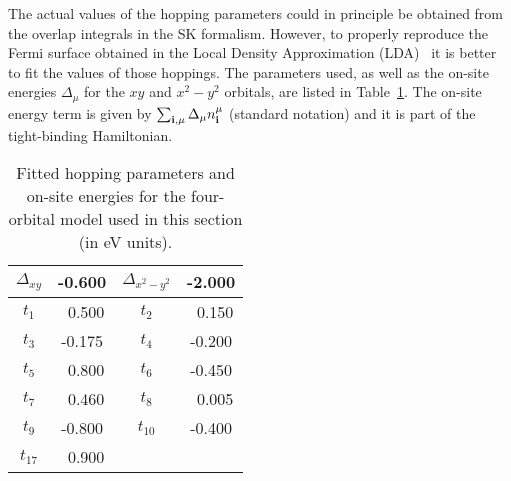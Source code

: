 \documentclass[aps,prb,superscriptaddress,preprintnumbers,
showpacs,legalpaper,twoside,twocolumn,amsmath,amssymb]{revtex4}
\begin{document}
The actual values of the hopping parameters could in principle be
obtained from the overlap integrals in the SK
formalism.\cite{slater,Moreoetal08}
However, to properly reproduce the Fermi surface obtained in the
Local Density Approximation (LDA)~\cite{singh,first, xu, cao, fang2} it is better to fit
the values of those hoppings. The
parameters used, as well as the on-site energies $\Delta_\mu$ for the
$xy$ and $x^2-y^2$ orbitals, are
listed in Table~\ref{T.hoppara}. The on-site energy term is
given by $\sum_{{\bf i},\mu} \Delta_{\mu} n^{\mu}_{\bf i}$ (standard notation)
and it is part of the tight-binding Hamiltonian.



\begin{table}[h]
\caption{Fitted hopping parameters and on-site energies for the
four-orbital model used in this section (in eV units).}\label{T.hoppara} \centering
\vskip 0.3cm
\begin{tabular}{||c|c||c|c||}
\hline
$\Delta_{xy}$ & -0.600 & $\Delta_{x^2-y^2}$ & -2.000 \\
\hline
$t_1$ & ~0.500 & $t_2$ & ~0.150 \\
\hline
$t_3$ & -0.175 & $t_4$ & -0.200 \\
\hline
$t_5$ & ~0.800 & $t_6$ & -0.450 \\
\hline
$t_7$ & ~0.460 & $t_8$ & ~0.005 \\
\hline
$t_9$ & -0.800 & $t_{10}$ & -0.400 \\
\hline
$t_{17}$ & ~0.900 & & \\
\hline
\end{tabular}
\end{table}



\end{document}
